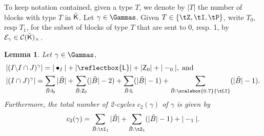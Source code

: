 \documentclass[11pt, a4paper, oneside, reqno]{amsart}
\newcommand{\sK}{{\sf K}}
\newtheorem{lemma}[theorem]{Lemma}
\theoremstyle{remark}
\theoremstyle{definition}
\numberwithin{equation}{section}
\begin{document}
To keep notation contained, given a type $T$, we denote by $|T|$ the number of blocks with type $T$ in $\tilde{\sK}$. Let $\gamma \in \Gammas$. Given $T\in \{ \tZ, \tI, \tP \}$, write  $T_0$, resp $T_1$, for the subset of blocks of type $T$ that are sent to $0$, resp. 1,  by $\mathcal{E}_{\gamma} \in \mathcal{C}(\tilde{\sK})_\times$.
\begin{lemma}\label{lem:sumsgamma}Let $\gamma \in \Gammas$,
	\begin{align}
		\label{eqn:fixedpointformulasgamma1}
		 & |(I\backslash I \cap J)^{\gamma}|= |\bullet_I| + |\reflectbox{\sf L}| + |{\sf Z}_{0}|+ |-_0|, \hspace{0.1cm} {\rm and}                                                                                                               \\
		\label{eqn:fixedpointformulasgamma2}
		 & |(I \cap J)^{\gamma}|= \sum_{\tilde{B}: {\sf I_0}}|\tilde{B}| + \sum_{\tilde{B}:{\sf Z_0}}(|\tilde{B}|-2) + \sum_{\substack{\tilde{B}:{\sf L}}}(|\tilde{B}|-1) + \sum_{\substack{\tilde{B}:{\scalebox{0.7}{\tLI}}}}(|\tilde{B}|-1).
	\end{align}
	Furthermore, the total number of 2-cycles $c_2(\gamma)$ of $\gamma$ is given by
	\begin{align} \label{eqn:numberofinversionsgamma}
		c_2(\gamma)	= \sum_{\tilde{B}: {\tI_1}}|\tilde{B}| + \sum_{\tilde{B}:{\tZ_1}}(|\tilde{B}| - 1) +|-_1|.
	\end{align}
\end{lemma}
\end{document}
